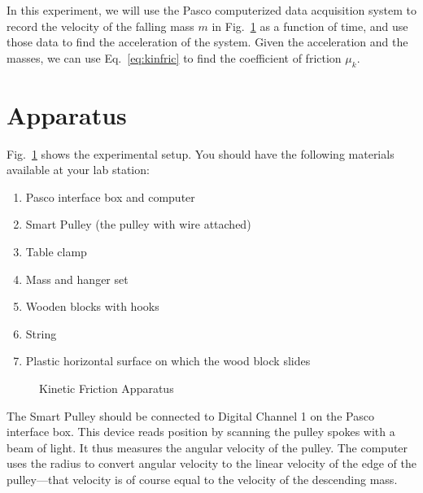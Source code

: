 In this experiment, we will use the Pasco computerized data
acquisition system to record the velocity of the falling mass $m$ in
Fig.~\ref{fig:kinetic} as a function of time, and use those data to
find the acceleration of the system.  Given the acceleration and the
masses, we can use Eq.~\ref{eq:kinfric} to find the coefficient of
friction $\mu_k$.

\section*{Apparatus}
Fig.~\ref{fig:kinetic} shows the experimental setup. You should have the following materials
available at your lab station:
\begin{enumerate}
\item Pasco interface box and computer
\item Smart Pulley (the pulley with wire attached)
\item Table clamp
\item Mass and hanger set
\item Wooden blocks with hooks
\item String
\item Plastic horizontal surface on which the wood block slides
\end {enumerate}
\begin{figure}[hbt]
\begin{center}
{}
\end{center}
 \caption{Kinetic Friction Apparatus  \label{fig:kinetic}}
\end{figure}
The Smart Pulley should be connected to Digital Channel 1 on the Pasco interface box.
This device reads position by scanning the pulley spokes with a beam
of light.  It thus measures the angular velocity of the pulley.  The
computer uses the radius to convert angular velocity to the linear
velocity of the edge of the pulley---that velocity is of course equal
to the velocity of the descending mass.

